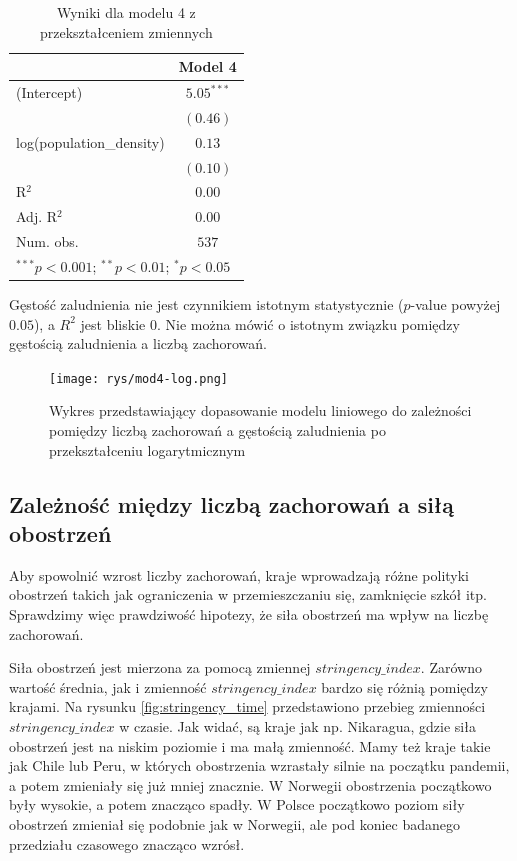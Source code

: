\documentclass[12pt]{mwbk}
\theoremstyle{plain}
\theoremstyle{definition}
\theoremstyle{definition}
\newcommand\zrodlo[1]{\par\vspace{-3mm}{\small\textit{Źródło: }#1 }}
\begin{document}
\begin{table}[!htbp]
	\begin{center}
		\begin{tabular}{l c}
			\hline
			& Model 4 \\
			\hline
			(Intercept)              & $5.05^{***}$ \\
			& $(0.46)$     \\
			log(population\_density) & $0.13$       \\
			& $(0.10)$     \\
			\hline
			R$^2$                    & $0.00$       \\
			Adj. R$^2$               & $0.00$       \\
			Num. obs.                & $537$        \\
			\hline
			\multicolumn{2}{l}{\scriptsize{$^{***}p<0.001$; $^{**}p<0.01$; $^{*}p<0.05$}}
		\end{tabular}
		\caption{Wyniki dla modelu 4 z przekształceniem zmiennych}
		\label{table:mod4}
	\end{center}
\end{table}

Gęstość zaludnienia nie jest czynnikiem istotnym statystycznie ($p$-value powyżej $0.05$), a $R^2$ jest bliskie 0. Nie można mówić o istotnym związku pomiędzy gęstością zaludnienia a liczbą zachorowań.

\newpage

\begin{figure}[!h]
	\centering
	\texttt{[image: rys/mod4-log.png]}
	\caption{Wykres przedstawiający dopasowanie modelu liniowego do zależności pomiędzy liczbą zachorowań a gęstością zaludnienia po przekształceniu logarytmicznym }
	\label{fig:mod4-lin}
	\zrodlo{Opracowanie własne}
\end{figure}








\subsection{Zależność między liczbą zachorowań a siłą obostrzeń}

Aby spowolnić wzrost liczby zachorowań, kraje wprowadzają różne polityki obostrzeń takich jak ograniczenia w przemieszczaniu się, zamknięcie szkół itp. Sprawdzimy więc prawdziwość hipotezy, że siła obostrzeń ma wpływ na liczbę zachorowań.

Siła obostrzeń jest mierzona za pomocą zmiennej $stringency\_index$. Zarówno wartość średnia, jak i zmienność $stringency\_index$ bardzo się różnią pomiędzy krajami. Na rysunku \ref{fig:stringency_time} przedstawiono przebieg zmienności $stringency\_index$ w czasie. Jak widać, są kraje jak np. Nikaragua, gdzie siła obostrzeń jest na niskim poziomie i ma małą zmienność. Mamy też kraje takie jak Chile lub Peru, w których obostrzenia wzrastały silnie na początku pandemii, a potem zmieniały się już mniej znacznie. W Norwegii obostrzenia początkowo były wysokie, a potem znacząco spadły. W Polsce początkowo poziom siły obostrzeń zmieniał się podobnie jak w Norwegii, ale pod koniec badanego przedziału czasowego znacząco wzrósł.
 
\end{document}
